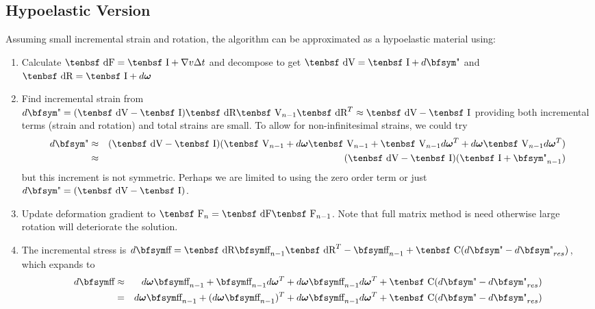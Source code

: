 \documentclass[11pt]{book}
\renewcommand{\vec}[1]{\boldsymbol{#1}}
\def\C{\hbox{\tenbsf C}}
\def\F{\hbox{\tenbsf F}}
\def\dF{\hbox{\tenbsf dF}}
\def\I{\hbox{\tenbsf I}}
\def\dR{\hbox{\tenbsf dR}}
\def\V{\hbox{\tenbsf V}}
\def\dV{\hbox{\tenbsf dV}}
\def\st{{\hbox{\bfsym\char'033}}}
\def\et{{\hbox{\bfsym\char'042}}}
\begin{document}
\subsection{Hypoelastic Version}

Assuming small incremental strain and rotation, the algorithm can be approximated as a hypoelastic material using:

\begin{enumerate}
\item Calculate $\dF = \I + \nabla v \Delta t$ and decompose to get $\dV=\I+d\et$ and $\dR=\I + d\vec\omega$
\item Find incremental strain from $d\et=(\dV-\I) \dR \V_{n-1} \dR^T \approx \dV-\I$ providing both incremental terms (strain and rotation) and total strains are small. To allow for non-infinitesimal strains, we could try
\begin{eqnarray}
    d\et  & \approx & (\dV-\I) (\V_{n-1}+ d\vec\omega\V_{n-1} + \V_{n-1}d\vec\omega^T+d\vec\omega\V_{n-1}d\vec\omega^T) \\
    & \approx & (\dV-\I) (\I+\et_{n-1}) 
\end{eqnarray}
but this increment is not symmetric. Perhaps we are limited to using the zero order term or just $d\et = (\dV-\I)$.
\item Update deformation gradient to $\F_n =  \dF\F_{n-1}$. Note that full matrix method is need otherwise large rotation will deteriorate the solution.
\item The incremental stress is $d\st =  \dR \st_{n-1} \dR^T  - \st_{n-1}+  \C(d\et - d\et_{res})$, which expands to
\begin{eqnarray}
    d\st & \approx & d\vec\omega\st_{n-1} + \st_{n-1} d\vec\omega^T +  d\vec\omega\st_{n-1}d\vec\omega^T + \C(d\et - d\et_{res}) \\
      & = & d\vec\omega\st_{n-1} + (d\vec\omega\st_{n-1})^T + d\vec\omega\st_{n-1}d\vec\omega^T+ \C(d\et - d\et_{res})
\end{eqnarray}
\end{enumerate}
\end{document}
